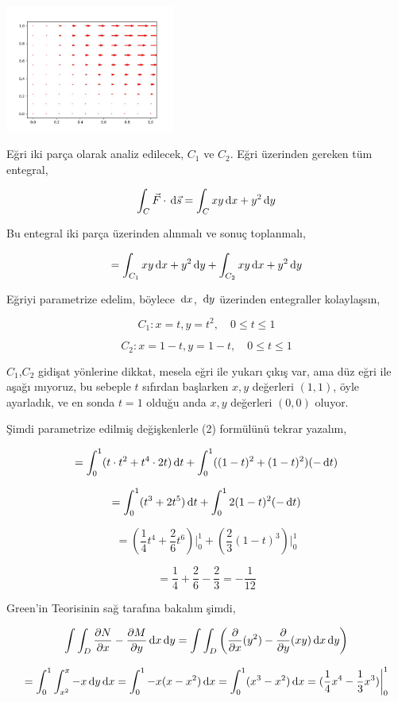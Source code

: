\documentclass[12pt,fleqn]{article}\usepackage{../../common}
\begin{document}
\includegraphics[width=15em]{calc_multi_75_green_01.jpg}

Eğri iki parça olarak analiz edilecek, $C_1$ ve $C_2$.  Eğri üzerinden gereken
tüm entegral,

$$
\int_C \vec{F} \cdot \,\mathrm{d}{\vec{s}} = \int_C xy \,\mathrm{d} x + y^2 \,\mathrm{d} y
$$

Bu entegral iki parça üzerinden alınmalı ve sonuç toplanmalı,

$$
= \int_{C_1} xy \,\mathrm{d} x + y^2 \,\mathrm{d} y + \int_{C_2} xy \,\mathrm{d} x + y^2 \,\mathrm{d} y
\label{2}
$$

Eğriyi parametrize edelim, böylece $\,\mathrm{d} x$, $\,\mathrm{d} y$ üzerinden entegraller
kolaylaşsın,

$$
C_1: x = t, y = t^2, \quad 0 \le t \le 1
$$

$$
C_2: x = 1-t, y = 1-t, \quad 0 \le t \le 1
$$

$C_1$,$C_2$ gidişat yönlerine dikkat, mesela eğri ile yukarı çıkış var, ama düz
eğri ile aşağı ınıyoruz, bu sebeple $t$ sıfırdan başlarken $x,y$ değerleri
$(1,1)$, öyle ayarladık, ve en sonda $t=1$ olduğu anda $x,y$ değerleri $(0,0)$
oluyor. 

Şimdi parametrize edilmiş değişkenlerle (2) formülünü tekrar yazalım,

$$
= \int_{0}^{1} ( t \cdot t^2 + t^4 \cdot 2t ) \,\mathrm{d} t +
\int_{0}^{1} ((1-t)^2 + (1-t)^2) (-\,\mathrm{d} t)
$$

$$
= \int_{0}^{1} (t^3 + 2t^5) \,\mathrm{d} t + \int _{0}^{1} 2 (1-t)^2 (-\,\mathrm{d} t)
$$

$$
= (\frac{1}{4} t^4 + \frac{2}{6} t^6) \big\vert_{0}^{1} +
(\frac{2}{3} (1-t)^3 ) \big\vert_{0}^{1}
$$

$$
= \frac{1}{4} + \frac{2}{6} - \frac{2}{3} = -\frac{1}{12}
$$

Green'in Teorisinin sağ tarafına bakalım şimdi, 

$$
\int \int_D \frac{\partial N}{\partial x} - \frac{\partial M}{\partial y} \,\mathrm{d} x \,\mathrm{d} y =
\int \int_D \left(
\frac{\partial }{\partial x}(y^2) - \frac{\partial }{\partial y}(xy) \,\mathrm{d} x \,\mathrm{d} y
\right)
$$

$$
= \int_{0}^{1} \int_{x^2}^{x} -x \,\mathrm{d} y \,\mathrm{d} x =
\int_{0}^{1} -x (x-x^2) \,\mathrm{d} x =
\int_{0}^{1} (x^3 - x^2) \,\mathrm{d} x = (\frac{1}{4} x^4 - \frac{1}{3} x^3 ) \bigg\vert_{0}^{1}
$$
\end{document}
